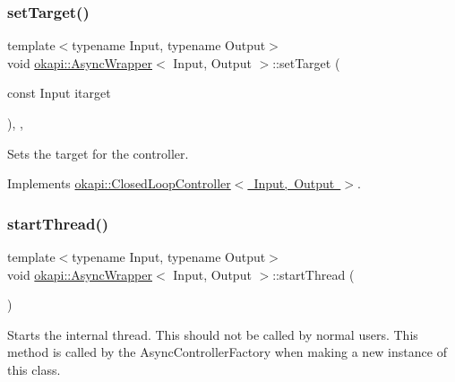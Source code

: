 \subsubsection{\texorpdfstring{setTarget()}{setTarget()}}
{\footnotesize\ttfamily template$<$typename Input, typename Output$>$ \\
void \mbox{\hyperlink{classokapi_1_1AsyncWrapper}{okapi\+::\+Async\+Wrapper}}$<$ Input, Output $>$\+::set\+Target (\begin{DoxyParamCaption}\item[{const Input}]{itarget }\end{DoxyParamCaption})\hspace{0.3cm}{\ttfamily [inline]}, {\ttfamily [override]}, {\ttfamily [virtual]}}

Sets the target for the controller. 

Implements \mbox{\hyperlink{classokapi_1_1ClosedLoopController_ac14482d0768b3f157d52e0214a4c36d7}{okapi\+::\+Closed\+Loop\+Controller$<$ Input, Output $>$}}.

\mbox{\label{classokapi_1_1AsyncWrapper_a5225a6b4748da30bf17ddbda692cbf4a}} 
\subsubsection{\texorpdfstring{startThread()}{startThread()}}
{\footnotesize\ttfamily template$<$typename Input, typename Output$>$ \\
void \mbox{\hyperlink{classokapi_1_1AsyncWrapper}{okapi\+::\+Async\+Wrapper}}$<$ Input, Output $>$\+::start\+Thread (\begin{DoxyParamCaption}{ }\end{DoxyParamCaption})\hspace{0.3cm}{\ttfamily [inline]}}

Starts the internal thread. This should not be called by normal users. This method is called by the Async\+Controller\+Factory when making a new instance of this class. \mbox{\label{classokapi_1_1AsyncWrapper_aa947c53d1f595ae6526f996da9b77ca9}} 
